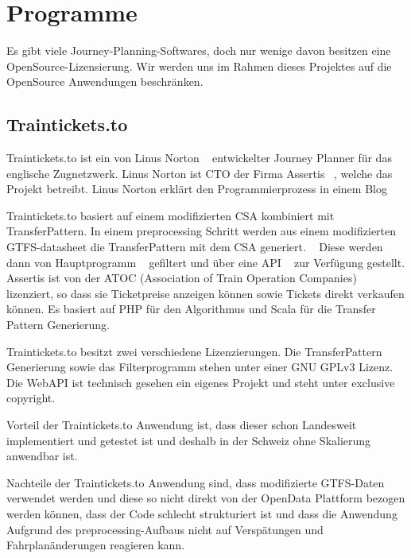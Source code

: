 

\section[Programme]{Programme}
\label{sec:programme}

Es gibt viele Journey-Planning-Softwares, doch nur wenige davon besitzen eine OpenSource-Lizensierung. Wir werden uns im Rahmen dieses Projektes auf die OpenSource Anwendungen beschränken.

\subsection{Traintickets.to} 
\label{sec:Traintickets.to}

Traintickets.to ist ein von Linus Norton ~\cite{LinusNorton} entwickelter Journey Planner für das englische Zugnetzwerk. Linus Norton ist CTO der Firma Assertis ~\cite{assertis}, welche das Projekt betreibt. Linus Norton erklärt den Programmierprozess in einem Blog ~\cite{traintickets_blog}


Traintickets.to basiert auf einem modifizierten CSA kombiniert mit TransferPattern. In einem preprocessing Schritt werden aus einem modifizierten GTFS-datasheet die TransferPattern mit dem CSA generiert. ~\cite{git_traintickets_pattern} Diese werden dann von Hauptprogramm ~\cite{git_traintickets_haupt} gefiltert und über eine API ~\cite{git_traintickets_api} zur Verfügung gestellt. Assertis ist von der ATOC (Association of Train Operation Companies) lizenziert, so dass sie Ticketpreise anzeigen können sowie Tickets direkt verkaufen können. Es basiert auf PHP für den Algorithmus und Scala für die Transfer Pattern Generierung.

Traintickets.to besitzt zwei verschiedene Lizenzierungen. Die TransferPattern Generierung sowie das Filterprogramm stehen unter einer GNU GPLv3 Lizenz. Die WebAPI ist technisch gesehen ein eigenes Projekt und steht unter exclusive copyright.

Vorteil der Traintickets.to Anwendung ist, dass dieser schon Landesweit implementiert und getestet ist und deshalb in der Schweiz ohne Skalierung anwendbar ist. ~\cite{traintickets_site}

Nachteile der Traintickets.to Anwendung sind, dass modifizierte GTFS-Daten verwendet werden und diese so nicht direkt von der OpenData Plattform bezogen werden können, dass der Code schlecht strukturiert ist und dass die Anwendung Aufgrund des preprocessing-Aufbaus nicht auf Verspätungen und Fahrplanänderungen reagieren kann.

